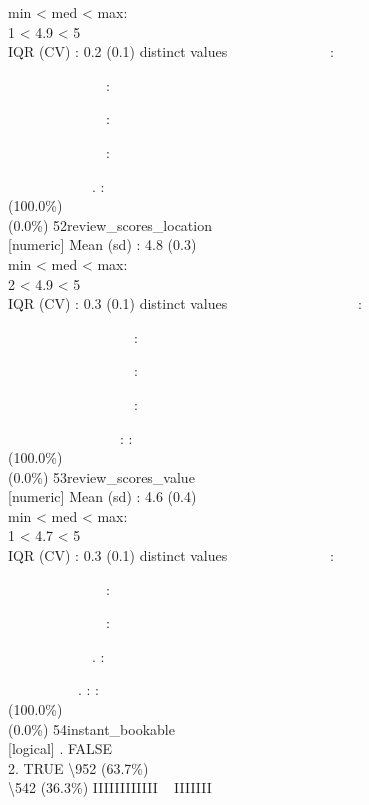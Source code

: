 \documentclass[
  journal,
]{IEEEtran}%
\begin{document}
min \textless{} med \textless{} max:\\
1 \textless{} 4.9 \textless{} 5\\
IQR (CV) : 0.2 (0.1)  distinct values \textbar{}
\textbar~~~~~~~~~~~~~~:\\
\strut ~~~~~~~~~~~~~~:\\
\strut ~~~~~~~~~~~~~~:\\
\strut ~~~~~~~~~~~~~~:\\
\strut ~~~~~~~~~~~~. : \\
(100.0\%) \\
(0.0\%) \textbar{} \textbar{} 52\textbar review\_scores\_location\\
{[}numeric{]} \textbar Mean (sd) : 4.8 (0.3)\\
min \textless{} med \textless{} max:\\
2 \textless{} 4.9 \textless{} 5\\
IQR (CV) : 0.3 (0.1)  distinct values \textbar{}
\textbar~~~~~~~~~~~~~~~~~~:\\
\strut ~~~~~~~~~~~~~~~~~~:\\
\strut ~~~~~~~~~~~~~~~~~~:\\
\strut ~~~~~~~~~~~~~~~~~~:\\
\strut ~~~~~~~~~~~~~~~~: : \\
(100.0\%) \\
(0.0\%) \textbar{} \textbar{} 53\textbar review\_scores\_value\\
{[}numeric{]} \textbar Mean (sd) : 4.6 (0.4)\\
min \textless{} med \textless{} max:\\
1 \textless{} 4.7 \textless{} 5\\
IQR (CV) : 0.3 (0.1)  distinct values \textbar{}
\textbar~~~~~~~~~~~~~~:\\
\strut ~~~~~~~~~~~~~~:\\
\strut ~~~~~~~~~~~~~~:\\
\strut ~~~~~~~~~~~~. :\\
\strut ~~~~~~~~~~. : : \\
(100.0\%) \\
(0.0\%) \textbar{} \textbar{} 54\textbar instant\_bookable\\
{[}logical{]} . FALSE\\
2. TRUE \textbar\textbackslash952 (63.7\%)\\
\textbackslash542 (36.3\%) \textbar{} \textbar IIIIIIIIIIII ~ IIIIIII
\\
\end{document}
